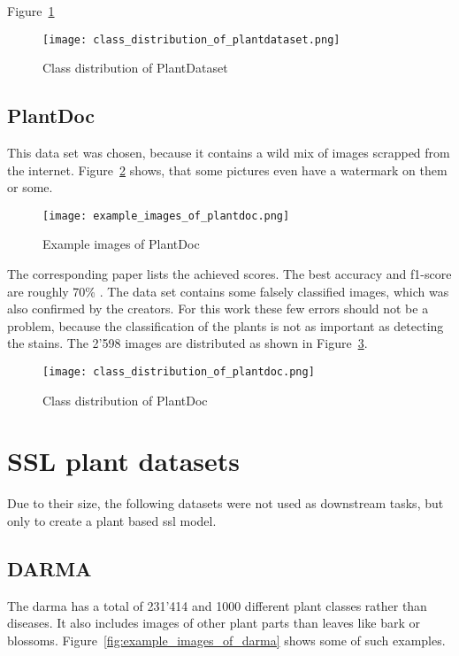 Figure~\ref{fig:class_distribution_of_plantdataset}
\begin{figure}[H]
    \begin{center}
    \texttt{[image: class\_distribution\_of\_plantdataset.png]}
    \caption{Class distribution of PlantDataset}\label{fig:class_distribution_of_plantdataset}
    \end{center}
\end{figure}

\subsection{PlantDoc}
This data set was chosen, because it contains a wild mix of images scrapped from the internet. Figure~\ref{fig:example_images_of_plantdoc} shows, that some pictures even have a watermark on them or some.
\begin{figure}[H]
    \begin{center}
    \texttt{[image: example\_images\_of\_plantdoc.png]}
    \caption{Example images of PlantDoc}\label{fig:example_images_of_plantdoc}
    \end{center}
\end{figure}
The corresponding paper lists the achieved scores. The best accuracy and f1-score are roughly 70\% \autocite{singh2020}. The data set contains some falsely classified images, which was also confirmed by the creators. For this work these few errors should not be a problem, because the classification of the plants is not as important as detecting the stains.
The 2'598 images are distributed as shown in Figure~\ref{fig:class_distribution_of_plantdoc}.

\begin{figure}[H]
    \begin{center}
    \texttt{[image: class\_distribution\_of\_plantdoc.png]}
    \caption{Class distribution of PlantDoc}\label{fig:class_distribution_of_plantdoc}
    \end{center}
\end{figure}

\section{SSL plant datasets}

Due to their size, the following datasets were not used as downstream tasks, but only to create a plant based \gls{ssl} model. 
\subsection{DARMA}
The \gls{darma} has a total of 231'414 and 1000 different plant classes rather than diseases. It also includes images of other plant parts than leaves like bark or blossoms. Figure~\ref{fig:example_images_of_darma} shows some of such examples.

